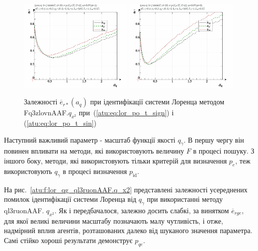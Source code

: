 \begin{figure}[ht!]
  \centerline{
    \includegraphics[width=0.49\textwidth]{p/cha/lor/Fq3zlovnAAF/lor_Fq3zlovnAAF_qx2-p_a_q_e_sign.png}
    \hfill
    \includegraphics[width=0.49\textwidth]{p/cha/lor/Fq3zlovnAAF/lor_Fq3zlovnAAF_qx2-p_a_q_e_sin.png}
  }
\caption{Залежності $ \overline{e}_{r *} (a_q) $ при ідентифікації системи Лоренца методом Fq3zlovnAAF.$q_{x^2} $ при~(\ref{atu:eq:lor_po_t_sign}) і (\ref{atu:eq:lor_po_t_sin})}
\label{atu:f:lor_a_q_Fq3zlovnAAF.q_x2}
\end{figure}


Наступний важливий параметр - масштаб функції якості
$ q_\gamma $. В першу чергу він повинен впливати на методи, які
використовують величину
$ F $ в процесі пошуку. З іншого боку, методи, які використовують
тільки критерій для визначення
$ p_e $, теж використовують
$ q_\gamma $ в процесі визначення
$ p_\mathrm{id} $.

На рис.~\ref{atu:f:lor_qg_ql3ruonAAF.q_x2} представлені залежності усереднених
помилок ідентифікації системи Лоренца від
$ q_\gamma $ при використанні методу ql3ruonAAF.
$ q_{x^2} $. Як і передбачалося, залежно досить слабкі, за винятком
$ \overline{e}_{rge} $, для якої великі величини масштабу позначають малу
чутливість, і отже, надмірний вплив агентів, розташованих далеко
від шуканого значення параметра. Самі стійко хороші результати
демонструє
$ p_{qe} $.

